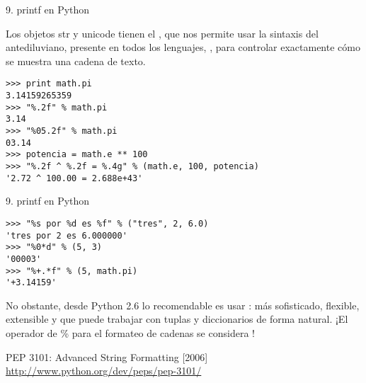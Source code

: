 
\begin{frame}[fragile]{9. printf en Python}
  \small
  \begin{block}{}
    \centering
    Los objetos str y unicode tienen el , que
    nos permite usar la sintaxis del antediluviano, presente en todos
    los lenguajes, , para controlar exactamente
    cómo se muestra una cadena de texto.
  \end{block}

  \footnotesize
  \begin{exampleblock}{}
    \begin{lstlisting}
>>> print math.pi
3.14159265359
>>> "%.2f" % math.pi
3.14
>>> "%05.2f" % math.pi
03.14
>>> potencia = math.e ** 100
>>> "%.2f ^ %.2f = %.4g" % (math.e, 100, potencia)
'2.72 ^ 100.00 = 2.688e+43'
    \end{lstlisting}
  \end{exampleblock}
\end{frame}

\begin{frame}[fragile]{9. printf en Python}
  \footnotesize
  \begin{exampleblock}{}
    \begin{lstlisting}
>>> "%s por %d es %f" % ("tres", 2, 6.0)
'tres por 2 es 6.000000'
>>> "%0*d" % (5, 3)
'00003'
>>> "%+.*f" % (5, math.pi)
'+3.14159'
    \end{lstlisting}
  \end{exampleblock}

  \begin{alertblock}{}
    \centering
    \small
    No obstante, desde Python 2.6 lo recomendable es usar
    : más sofisticado, flexible, extensible y
    que puede trabajar con tuplas y diccionarios de forma natural. ¡El
    operador de \% para el formateo de cadenas se considera
    !
  \end{alertblock}

  \begin{block}
    {\centering PEP 3101: Advanced String Formatting [2006]}
    \centering \url{http://www.python.org/dev/peps/pep-3101/}
  \end{block}
\end{frame}
